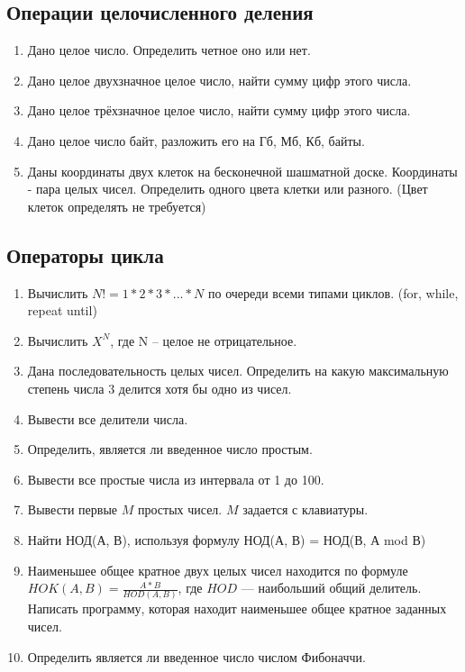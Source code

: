 \subsection{Операции целочисленного деления}

\begin{enumerate}
  \item Дано целое число. Определить четное оно или нет.

  \item Дано целое двухзначное целое число, найти сумму цифр этого числа.

  \item Дано целое трёхзначное целое число, найти сумму цифр этого числа.

  \item Дано целое число байт, разложить его на Гб, Мб, Кб, байты.

  \item Даны координаты двух клеток на бесконечной шашматной доске. Координаты - пара целых чисел. Определить одного цвета клетки или разного. (Цвет клеток определять не требуется)
  
\end{enumerate}

\subsection{Операторы цикла}

\begin{enumerate}
  \item Вычислить $N! = 1*2*3*...*N$ по очереди всеми типами циклов. (for, while, repeat until)

  \item Вычислить $X^N$, где N -- целое не отрицательное.

  \item Дана последовательность целых чисел. Определить на какую максимальную степень числа 3 делится хотя бы одно из чисел.

  \item Вывести все делители числа.

  \item Определить, является ли введенное число простым.

  \item Вывести все простые числа из интервала от 1 до 100.

  \item Вывести первые $M$ простых чисел. $M$ задается с клавиатуры.

  \item Найти НОД(А, В), используя формулу НОД(А, В) = НОД(В, А mod В)
  
  \item Наименьшее общее кратное двух целых чисел находится по формуле $HOK(A,B)=\frac{A*B}{HOD(A,B)}$, где $HOD$ --- наибольший общий делитель. Написать программу, которая находит наименьшее общее кратное заданных чисел.

  \item Определить является ли введенное число числом Фибоначчи.
\end{enumerate}

